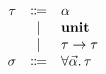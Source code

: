 \documentclass[12pt]{article}
\begin{document}
\pagestyle{empty}

\begin{align*}
    \begin{array}{rcl}
        \tau
        &\Coloneqq &\alpha \\
        &\mid &\mathbf{unit} \\
        &\mid & \tau \to \tau \\
        \sigma
        &\Coloneqq &\forall \vec{\alpha}\ldotp \tau
    \end{array}
\end{align*}
\end{document}
